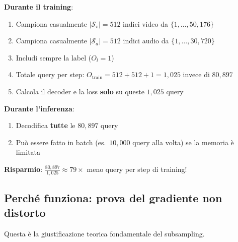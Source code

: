 \documentclass[12pt,a4paper]{article}
\begin{document}
\begin{formulabox}
\textbf{Durante il training}:
\begin{enumerate}
    \item Campiona casualmente $|\mathcal{S}_v| = 512$ indici video da $\{1, \ldots, 50{,}176\}$
    \item Campiona casualmente $|\mathcal{S}_a| = 512$ indici audio da $\{1, \ldots, 30{,}720\}$
    \item Includi sempre la label ($O_l = 1$)
    \item Totale query per step: $O_{\text{train}} = 512 + 512 + 1 = 1{,}025$ invece di $80{,}897$
    \item Calcola il decoder e la loss \textbf{solo} su queste $1{,}025$ query
\end{enumerate}

\textbf{Durante l'inferenza}:
\begin{enumerate}
    \item Decodifica \textbf{tutte} le $80{,}897$ query
    \item Pu\`o essere fatto in batch (es.\ $10{,}000$ query alla volta) se la memoria \`e limitata
\end{enumerate}

\textbf{Risparmio}: $\frac{80{,}897}{1{,}025} \approx 79\times$ meno query per step di training!
\end{formulabox}

\subsection{Perch\'e funziona: prova del gradiente non distorto}

Questa \`e la giustificazione teorica fondamentale del subsampling.
\end{document}
